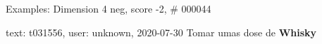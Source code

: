 \begin{frame}{Examples: Dimension 4 neg, score -2, \# 000044}
\footnotesize
\begin{alertblock}{text: t031556, user: unknown, 2020-07-30}
Tomar umas dose de \textbf{Whisky} \textbf{} 
\end{alertblock}
\end{frame}
